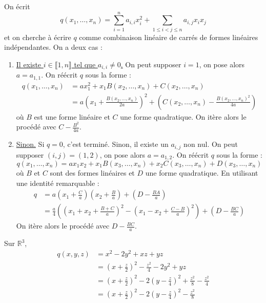   \begin{theorem}
    On écrit
    \[ q(x_1, \dots, x_n) = \sum_{i=1}^n a_{i,i} x_i^2 + \sum_{1 \leq i<j \leq n} a_{i,j} x_ix_j \]
    et on cherche à écrire $q$ comme combinaison linéaire de carrés de formes linéaires indépendantes. On a deux cas :
    \begin{enumerate}[label={\bfseries(\roman*)}]
      \item \underline{Il existe $i \in \llbracket 1, n \rrbracket$ tel que $a_{i,i} \neq 0$.} On peut supposer $i = 1$, on pose alors $a = a_{1,1}$. On réécrit $q$ sous la forme :
      \begin{align*}
        q(x_1, \dots, x_n) &= ax_1^2 + x_1B(x_2, \dots, x_n) + C(x_2, \dots, x_n) \\
        &= a\left( x_1 + \frac{B(x_2, \dots, x_n)}{2a} \right)^2 + \left( C(x_2, \dots, x_n) - \frac{B(x_2, \dots, x_n)^2}{4a} \right)
      \end{align*}
      où $B$ est une forme linéaire et $C$ une forme quadratique. On itère alors le procédé avec $C - \frac{B^2}{4a}$.
      \item \underline{Sinon.} Si $q = 0$, c'est terminé. Sinon, il existe un $a_{i,j}$ non nul. On peut supposer $(i,j) = (1,2)$, on pose alors $a = a_{1,2}$. On réécrit $q$ sous la forme :
      \[ q(x_1, \dots, x_n) = ax_1x_2 + x_1B(x_3, \dots, x_n) + x_2C(x_3, \dots, x_n) + D(x_3, \dots, x_n) \]
      où $B$ et $C$ sont des formes linéaires et $D$ une forme quadratique. En utilisant une identité remarquable :
      \begin{align*}
        q &= a\left( x_1 + \frac{C}{a} \right) \left( x_2 + \frac{B}{a} \right) + \left( D - \frac{BA}{a} \right) \\
        &= \frac{a}{4} \left( \left( x_1 + x_2 + \frac{B+C}{a} \right)^2 - \left( x_1 - x_2 + \frac{C-B}{a} \right)^2 \right) + \left( D - \frac{BC}{a} \right)
      \end{align*}
      On itère alors le procédé avec $D - \frac{BC}{a}$.
    \end{enumerate}
  \end{theorem}

  \begin{example}
    \label{170-2}
    Sur $\mathbb{R}^3$,
    \begin{align*}
      q(x,y,z) &= x^2 - 2y^2 + xz + yz \\
      &= \left( x + \frac{z}{2} \right)^2 - \frac{z^2}{4} - 2y^2 + yz \\
      &= \left( x + \frac{z}{2} \right)^2 - 2 \left( y - \frac{z}{4} \right)^2 + \frac{z^2}{8} - \frac{z^2}{4} \\
      &= \left( x + \frac{z}{2} \right)^2 - 2 \left( y - \frac{z}{4} \right)^2 - \frac{z^2}{8}
    \end{align*}
  \end{example}

